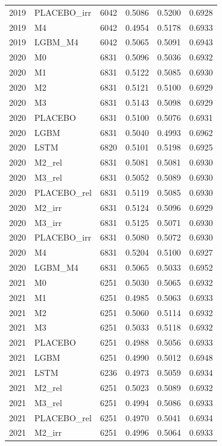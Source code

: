 \begin{tabular}{llrrrr}
2019 & PLACEBO\_irr & 6042 & 0.5086 & 0.5200 & 0.6928 \\
2019 & M4 & 6042 & 0.4954 & 0.5178 & 0.6933 \\
2019 & LGBM\_M4 & 6042 & 0.5065 & 0.5091 & 0.6943 \\
2020 & M0 & 6831 & 0.5096 & 0.5036 & 0.6932 \\
2020 & M1 & 6831 & 0.5122 & 0.5085 & 0.6930 \\
2020 & M2 & 6831 & 0.5121 & 0.5100 & 0.6929 \\
2020 & M3 & 6831 & 0.5143 & 0.5098 & 0.6929 \\
2020 & PLACEBO & 6831 & 0.5100 & 0.5076 & 0.6931 \\
2020 & LGBM & 6831 & 0.5040 & 0.4993 & 0.6962 \\
2020 & LSTM & 6820 & 0.5101 & 0.5198 & 0.6925 \\
2020 & M2\_rel & 6831 & 0.5081 & 0.5081 & 0.6930 \\
2020 & M3\_rel & 6831 & 0.5052 & 0.5089 & 0.6930 \\
2020 & PLACEBO\_rel & 6831 & 0.5119 & 0.5085 & 0.6930 \\
2020 & M2\_irr & 6831 & 0.5124 & 0.5096 & 0.6929 \\
2020 & M3\_irr & 6831 & 0.5125 & 0.5071 & 0.6930 \\
2020 & PLACEBO\_irr & 6831 & 0.5080 & 0.5072 & 0.6930 \\
2020 & M4 & 6831 & 0.5204 & 0.5100 & 0.6927 \\
2020 & LGBM\_M4 & 6831 & 0.5065 & 0.5033 & 0.6952 \\
2021 & M0 & 6251 & 0.5030 & 0.5065 & 0.6932 \\
2021 & M1 & 6251 & 0.4985 & 0.5063 & 0.6933 \\
2021 & M2 & 6251 & 0.5060 & 0.5114 & 0.6932 \\
2021 & M3 & 6251 & 0.5033 & 0.5118 & 0.6932 \\
2021 & PLACEBO & 6251 & 0.4988 & 0.5056 & 0.6933 \\
2021 & LGBM & 6251 & 0.4990 & 0.5012 & 0.6948 \\
2021 & LSTM & 6236 & 0.4973 & 0.5059 & 0.6934 \\
2021 & M2\_rel & 6251 & 0.5023 & 0.5089 & 0.6932 \\
2021 & M3\_rel & 6251 & 0.4994 & 0.5086 & 0.6933 \\
2021 & PLACEBO\_rel & 6251 & 0.4970 & 0.5041 & 0.6934 \\
2021 & M2\_irr & 6251 & 0.4996 & 0.5064 & 0.6933 \\

\end{tabular}
